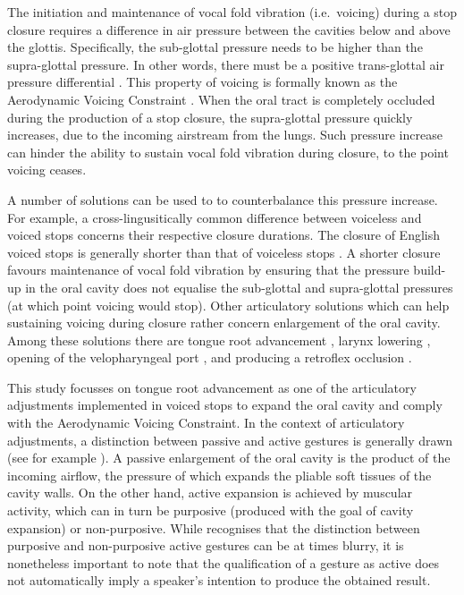 \documentclass[preprint]{JASAnew}
\begin{document}
The initiation and maintenance of vocal fold vibration (i.e.~voicing)
during a stop closure requires a difference in air pressure between the
cavities below and above the glottis. Specifically, the sub-glottal
pressure needs to be higher than the supra-glottal pressure. In other
words, there must be a positive trans-glottal air pressure differential
\citep{berg1958, rothenberg1967}. This property of voicing is formally
known as the Aerodynamic Voicing Constraint \citep{ohala2011}. When the
oral tract is completely occluded during the production of a stop
closure, the supra-glottal pressure quickly increases, due to the
incoming airstream from the lungs. Such pressure increase can hinder the
ability to sustain vocal fold vibration during closure, to the point
voicing ceases.

A number of solutions can be used to to counterbalance this pressure
increase. For example, a cross-lingusitically common difference between
voiceless and voiced stops concerns their respective closure durations.
The closure of English voiced stops is generally shorter than that of
voiceless stops
\citep{lisker1957, umeda1977, van-summers1987, davis1989, de-jong1991}.
A shorter closure favours maintenance of vocal fold vibration by
ensuring that the pressure build-up in the oral cavity does not equalise
the sub-glottal and supra-glottal pressures (at which point voicing
would stop). Other articulatory solutions which can help sustaining
voicing during closure rather concern enlargement of the oral cavity.
Among these solutions there are tongue root advancement
\citep{kent1969, perkell1969, westbury1983, rothenberg1967, ahn2018},
larynx lowering \citep{riordan1980}, opening of the velopharyngeal port
\citep{yanagihara1966}, and producing a retroflex occlusion
\citep{sprouse2008}.

This study focusses on tongue root advancement as one of the
articulatory adjustments implemented in voiced stops to expand the oral
cavity and comply with the Aerodynamic Voicing Constraint. In the
context of articulatory adjustments, a distinction between passive and
active gestures is generally drawn (see for example
\citealt{rothenberg1967}). A passive enlargement of the oral cavity is
the product of the incoming airflow, the pressure of which expands the
pliable soft tissues of the cavity walls. On the other hand, active
expansion is achieved by muscular activity, which can in turn be
purposive (produced with the goal of cavity expansion) or non-purposive.
While \citet{rothenberg1967} recognises that the distinction between
purposive and non-purposive active gestures can be at times blurry, it
is nonetheless important to note that the qualification of a gesture as
active does not automatically imply a speaker's intention to produce the
obtained result.
\end{document}
